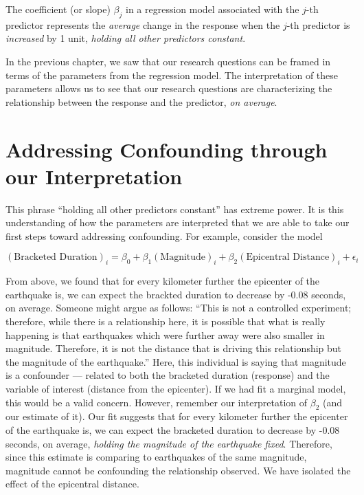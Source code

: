 \documentclass[]{book}
\theoremstyle{definition}
\theoremstyle{definition}
\theoremstyle{definition}
\theoremstyle{remark}
\let\BeginKnitrBlock\begin \let\EndKnitrBlock\end
\begin{document}
\BeginKnitrBlock{rmdtip}
The coefficient (or slope) \(\beta_j\) in a regression model associated
with the \(j\)-th predictor represents the \emph{average} change in the
response when the \(j\)-th predictor is \emph{increased} by 1 unit,
\emph{holding all other predictors constant}.
\EndKnitrBlock{rmdtip}

In the previous chapter, we saw that our research questions can be
framed in terms of the parameters from the regression model. The
interpretation of these parameters allows us to see that our research
questions are characterizing the relationship between the response and
the predictor, \emph{on average}.

\section{Addressing Confounding through our
Interpretation}\label{addressing-confounding-through-our-interpretation}

This phrase ``holding all other predictors constant'' has extreme power.
It is this understanding of how the parameters are interpreted that we
are able to take our first steps toward addressing confounding. For
example, consider the model

\[(\text{Bracketed Duration})_i = \beta_0 + \beta_1(\text{Magnitude})_i + \beta_2(\text{Epicentral Distance})_i + \epsilon_i\]

From above, we found that for every kilometer further the epicenter of
the earthquake is, we can expect the brackted duration to decrease by
-0.08 seconds, on average. Someone might argue as follows: ``This is not
a controlled experiment; therefore, while there is a relationship here,
it is possible that what is really happening is that earthquakes which
were further away were also smaller in magnitude. Therefore, it is not
the distance that is driving this relationship but the magnitude of the
earthquake.'' Here, this individual is saying that magnitude is a
confounder --- related to both the bracketed duration (response) and the
variable of interest (distance from the epicenter). If we had fit a
marginal model, this would be a valid concern. However, remember our
interpretation of \(\beta_2\) (and our estimate of it). Our fit suggests
that for every kilometer further the epicenter of the earthquake is, we
can expect the bracketed duration to decrease by -0.08 seconds, on
average, \emph{holding the magnitude of the earthquake fixed}.
Therefore, since this estimate is comparing to earthquakes of the same
magnitude, magnitude cannot be confounding the relationship observed. We
have isolated the effect of the epicentral distance.
\end{document}
